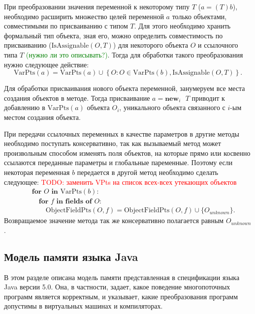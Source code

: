 \documentclass[14pt,titlepage]{extarticle}
\newcommand{\NEWi}[1]{\textbf{new}_{#1}\textbf{ }}
\newcommand{\VPts}[1]{\textrm{VarPts}(#1)}
\newcommand{\OFPts}[2]{\textrm{ObjectFieldPts}(#1, #2)}
\newcommand{\IsAssignable}[2]{\textrm{IsAssignable}(#1, #2)}
\newcommand{\remark}[1]{\textcolor{Green}{#1}}
\newcommand{\todo}[1]{\textcolor{red}{\eng{TODO}: #1}}
\newcommand{\eng}[1]{{\English#1}}
\begin{document}
      При преобразовании значения переменной к некоторому типу $T$
      ($a = (T)b$), необходимо расширить множество целей переменной $a$ только
      объектами, совместимыми по присваиванию с типом $T$. Для этого необходимо
      хранить формальный тип объекта, зная его, можно определить совместимость
      по присваиванию ($\IsAssignable{O}{T}$) для некоторого объекта $O$ и
      ссылочного типа $T$\remark{ (нужно ли это описывать?)}.
      Тогда для обработки такого преобразования нужно следующее действие:
      \[
        \VPts{a} = \VPts{a} \cup
            \left\{ O \colon O \in \VPts{b}, \IsAssignable{O}{T} \right\}.
      \]

      Для обработки присваивания нового объекта переменной, занумеруем
      все места создания объектов в методе. Тогда присваивание $a = \NEWi{i} T$
      приводит к добавлению в $\VPts{a}$ объекта $O_i$, уникального
      объекта связанного с $i$-ым местом создания объекта.

      При передачи ссылочных переменных в качестве параметров в другие
      методы необходимо поступать консервативно, так как вызываемый метод
      может произвольным способом изменять поля объектов, на которые прямо или
      косвенно ссылаются переданные параметры и глобальные паременные. Поэтому
      если некоторая переменная $b$ передается в другой метод необходимо
      сделать следующее:
      \todo{заменить VPts на список всех-всех утекающих объектов}
      \begin{eqnarray*}
        &&\textbf{for } O \textbf{ in } \VPts{b} \colon \\
        &&\quad\textbf{for } f \textbf{ in fields of } O \colon \\
        &&\qquad\OFPts{O}{f} = \OFPts{O}{f} \cup \{O_{unknown}\}.
      \end{eqnarray*}
      Возвращаемое значение метода так же консервативно полагается равным
      $O_{unknown}$.

    \subsection{Модель памяти языка Java}

      В этом разделе описана модель памяти представленная в спецификации языка
      Java версии 5.0. Она, в частности, задает, какое поведение многопоточных
      программ является корректным, и указывает, какие преобразования программ
      допустимы в виртуальных машинах и компиляторах.
\end{document}
